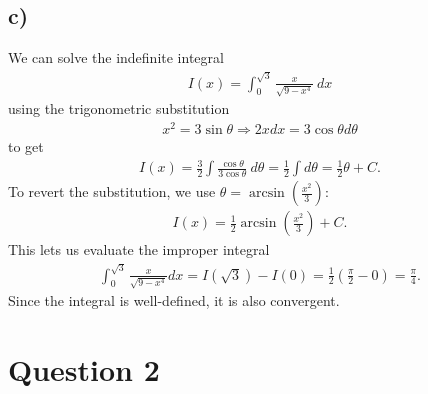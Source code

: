 \documentclass{article}
\begin{document}
\subsection*{c)}
We can solve the indefinite integral
\begin{align*}
	I(x)=\int_0^{\sqrt{3}}\frac{x}{\sqrt{9-x^4}}\:dx
\end{align*}
using the trigonometric substitution
\begin{align*}
	x^2 = 3\sin\theta \Rightarrow 2xdx = 3\cos \theta d\theta
\end{align*}
to get
\begin{align*}
	I(x)=\frac{3}{2}\int \frac{\cos\theta}{3\cos\theta}\:d\theta = \frac{1}{2}\int d\theta = \frac{1}{2}\theta + C.
\end{align*}
To revert the substitution, we use $\theta = \arcsin\left(\frac{x^2}{3}\right)$:
\begin{align*}
	I(x)=\frac{1}{2}\arcsin\left(\frac{x^2}{3}\right)+C.
\end{align*}
This lets us evaluate the improper integral
\begin{align*}
	\int_0^{\sqrt{3}}\frac{x}{\sqrt{9-x^4}}dx = I(\sqrt{3})-I(0)=\frac{1}{2}\left(\frac{\pi}{2}-0\right)=\frac{\pi}{4}.
\end{align*}
Since the integral is well-defined, it is also convergent.
\section*{Question 2}
\end{document}
